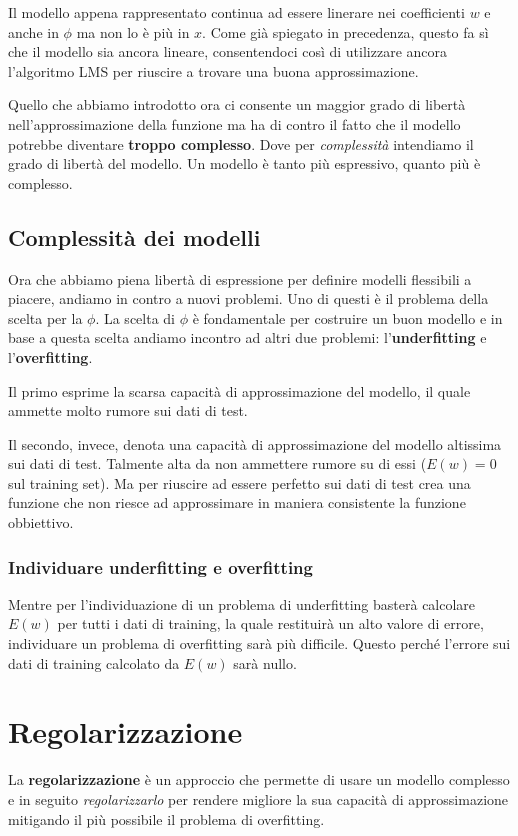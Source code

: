 Il modello appena rappresentato continua ad essere linerare nei coefficienti $w$ e anche in $\phi$ ma non lo \`e pi\`u
in $x$. Come gi\`a spiegato in precedenza, questo fa s\`i che il modello sia ancora lineare, consentendoci cos\`i di
utilizzare ancora l'algoritmo LMS per riuscire a trovare una buona approssimazione.

Quello che abbiamo introdotto ora ci consente un maggior grado di libert\`a nell'approssimazione della funzione ma ha
di contro il fatto che il modello potrebbe diventare \textbf{troppo complesso}. Dove per \emph{complessit\`a} intendiamo
il grado di libert\`a del modello. Un modello \`e tanto pi\`u espressivo, quanto pi\`u \`e complesso.

\subsection{Complessit\`a dei modelli}
Ora che abbiamo piena libert\`a di espressione per definire modelli flessibili a piacere, andiamo in contro a nuovi
problemi. Uno di questi \`e il problema della scelta per la $\phi$. La scelta di $\phi$ \`e fondamentale per costruire
un buon modello e in base a questa scelta andiamo incontro ad altri due problemi: l'\textbf{underfitting} e
l'\textbf{overfitting}.

Il primo esprime la scarsa capacit\`a di approssimazione del modello, il quale ammette molto rumore sui dati di test.

Il secondo, invece, denota una capacit\`a di approssimazione del modello altissima sui dati di test. Talmente alta da
non ammettere rumore su di essi ($E(w) = 0$ sul training set). Ma per riuscire ad essere perfetto sui dati di test crea
una funzione che non riesce ad approssimare in maniera consistente la funzione obbiettivo.

\subsubsection{Individuare underfitting e overfitting}
Mentre per l'individuazione di un problema di underfitting baster\`a calcolare $E(w)$ per tutti i dati di training,
la quale restituir\`a un alto valore di errore, individuare un problema di overfitting sar\`a pi\`u difficile.
Questo perch\'e l'errore sui dati di training calcolato da $E(w)$ sar\`a nullo.

\section{Regolarizzazione}
La \textbf{regolarizzazione} \`e un approccio che permette di usare un modello complesso e in seguito
\emph{regolarizzarlo} per rendere migliore la sua capacit\`a di approssimazione mitigando il pi\`u possibile il
problema di overfitting.

